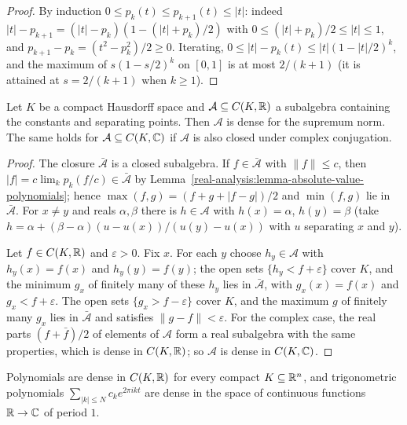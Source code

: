 \begin{proof}
By induction $0 \leq p_k(t) \leq p_{k+1}(t) \leq |t|$: indeed $|t| - p_{k+1} = (|t| - p_k)(1 - (|t| + p_k)/2)$ with $0 \leq (|t| + p_k)/2 \leq |t| \leq 1$, and $p_{k+1} - p_k = (t^2 - p_k^2)/2 \geq 0$. Iterating,
$0 \leq |t| - p_k(t) \leq |t|(1 - |t|/2)^k$, and the maximum of $s(1 - s/2)^k$ on $[0, 1]$ is at most $2/(k + 1)$ (it is attained at $s = 2/(k+1)$ when $k \geq 1$).
\end{proof}

\begin{theorem}\label{real-analysis:theorem-stone-weierstrass}
Let $K$ be a compact Hausdorff space and $\mathcal{A} \subseteq C(K, \mathbb{R})$ a subalgebra containing the constants and separating points. Then $\mathcal{A}$ is dense for the supremum norm. The same holds
for $\mathcal{A} \subseteq C(K, \mathbb{C})$ if $\mathcal{A}$ is also closed under complex conjugation.
\end{theorem}

\begin{proof}
The closure $\bar{\mathcal{A}}$ is a closed subalgebra. If $f \in \bar{\mathcal{A}}$ with $\|f\| \leq c$, then $|f| = c\lim_kp_k(f/c) \in \bar{\mathcal{A}}$ by Lemma~\ref{real-analysis:lemma-absolute-value-polynomials};
hence $\max(f, g) = (f + g + |f - g|)/2$ and $\min(f, g)$ lie in $\bar{\mathcal{A}}$. For $x \neq y$ and reals $\alpha, \beta$ there is $h \in \mathcal{A}$ with $h(x) = \alpha$, $h(y) = \beta$ (take
$h = \alpha + (\beta - \alpha)(u - u(x))/(u(y) - u(x))$ with $u$ separating $x$ and $y$).

Let $f \in C(K, \mathbb{R})$ and $\varepsilon > 0$. Fix $x$. For each $y$ choose $h_y \in \mathcal{A}$ with $h_y(x) = f(x)$ and $h_y(y) = f(y)$; the open sets $\{h_y < f + \varepsilon\}$ cover $K$, and the minimum $g_x$ of
finitely many of these $h_y$ lies in $\bar{\mathcal{A}}$, with $g_x(x) = f(x)$ and $g_x < f + \varepsilon$. The open sets $\{g_x > f - \varepsilon\}$ cover $K$, and the maximum $g$ of finitely many $g_x$ lies in
$\bar{\mathcal{A}}$ and satisfies $\|g - f\| < \varepsilon$. For the complex case, the real parts $(f + \bar f)/2$ of elements of $\mathcal{A}$ form a real subalgebra with the same properties, which is dense
in $C(K, \mathbb{R})$; so $\mathcal{A}$ is dense in $C(K, \mathbb{C})$.
\end{proof}

\begin{corollary}\label{real-analysis:corollary-weierstrass}
Polynomials are dense in $C(K, \mathbb{R})$ for every compact $K \subseteq \mathbb{R}^n$, and trigonometric polynomials $\sum_{|k| \leq N}c_ke^{2\pi ikt}$ are dense in the space of continuous functions $\mathbb{R} \to \mathbb{C}$ of
period $1$.
\end{corollary}

